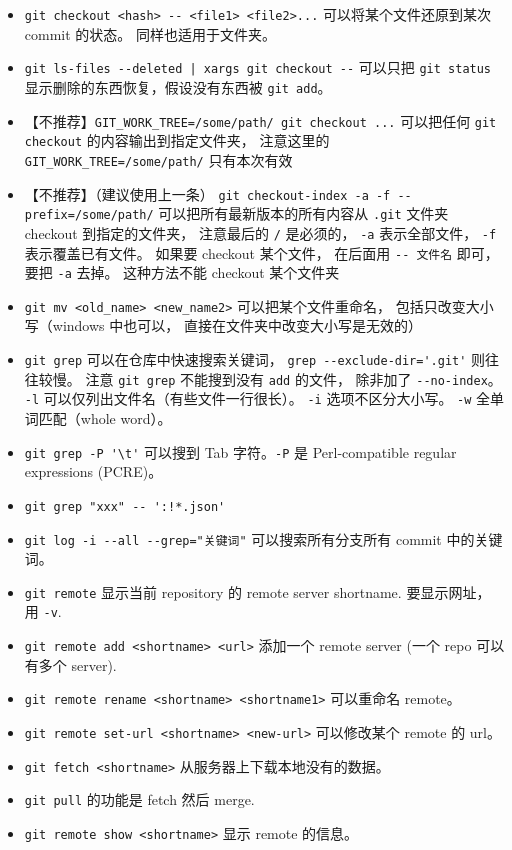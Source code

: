 \begin{itemize}
\item \verb`git checkout <hash> -- <file1> <file2>...` 可以将某个文件还原到某次 commit 的状态。 同样也适用于文件夹。
\item \verb`git ls-files --deleted | xargs git checkout --` 可以只把 \verb`git status` 显示删除的东西恢复，假设没有东西被 \verb`git add`。
\item 【不推荐】\verb`GIT_WORK_TREE=/some/path/ git checkout ...` 可以把任何 \verb`git checkout` 的内容输出到指定文件夹， 注意这里的 \verb`GIT_WORK_TREE=/some/path/` 只有本次有效
\item 【不推荐】（建议使用上一条） \verb`git checkout-index -a -f --prefix=/some/path/` 可以把所有最新版本的所有内容从 \verb`.git` 文件夹 checkout 到指定的文件夹， 注意最后的 \verb`/` 是必须的， \verb`-a` 表示全部文件， \verb`-f` 表示覆盖已有文件。 如果要 checkout 某个文件， 在后面用 \verb`-- 文件名` 即可， 要把 \verb`-a` 去掉。 这种方法不能 checkout 某个文件夹
\item \verb`git mv <old_name> <new_name2>` 可以把某个文件重命名， 包括只改变大小写（windows 中也可以， 直接在文件夹中改变大小写是无效的）
\item \verb`git grep` 可以在仓库中快速搜索关键词， \verb`grep --exclude-dir='.git'` 则往往较慢。 注意 \verb`git grep` 不能搜到没有 \verb`add` 的文件， 除非加了 \verb`--no-index`。 \verb`-l` 可以仅列出文件名（有些文件一行很长）。 \verb`-i` 选项不区分大小写。 \verb`-w` 全单词匹配（whole word）。
\item \verb`git grep -P '\t'` 可以搜到 Tab 字符。\verb`-P` 是 Perl-compatible regular expressions (PCRE)。
\item \verb`git grep "xxx" -- ':!*.json'`
\item \verb`git log -i --all --grep="关键词"` 可以搜索所有分支所有 commit 中的关键词。
\item \verb`git remote` 显示当前 repository 的 remote server shortname. 要显示网址， 用 \verb`-v`.
\item \verb`git remote add <shortname> <url>` 添加一个 remote server (一个 repo 可以有多个 server).
\item \verb`git remote rename <shortname> <shortname1>` 可以重命名 remote。
\item \verb`git remote set-url <shortname> <new-url>` 可以修改某个 remote 的 url。
\item \verb`git fetch <shortname>` 从服务器上下载本地没有的数据。
\item \verb`git pull` 的功能是 fetch 然后 merge.
\item \verb`git remote show <shortname>` 显示 remote 的信息。

\end{itemize}
